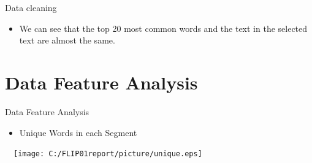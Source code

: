 \documentclass[
 size=14pt,
 paper=smartboard,  %
 mode=present, 		%
 display=slides, 	%
 style=tuliplab,  	%
 pauseslide,
 fleqn,leqno]{powerdot}
\begin{document}


\begin{slide}[toc=,bm=]{Data cleaning}
\begin{itemize}
\item
We can see that the top 20 most common words and the text in the selected text are almost the same.
\end{itemize}
\vspace{-0.8cm}
\begin{figure}[htbp]
\centering
{}%
%
\centering
\end{figure}
\end{slide}

\section{Data Feature Analysis}
\begin{slide}[toc=,bm=]{Data Feature Analysis}
\begin{itemize}
\item
Unique Words in each Segment
\end{itemize}
\vspace{-0.8cm}
\begin{center}
  \texttt{[image: C:/FLIP01report/picture/unique.eps]}
\end{center}
\end{slide}

\end{document}
